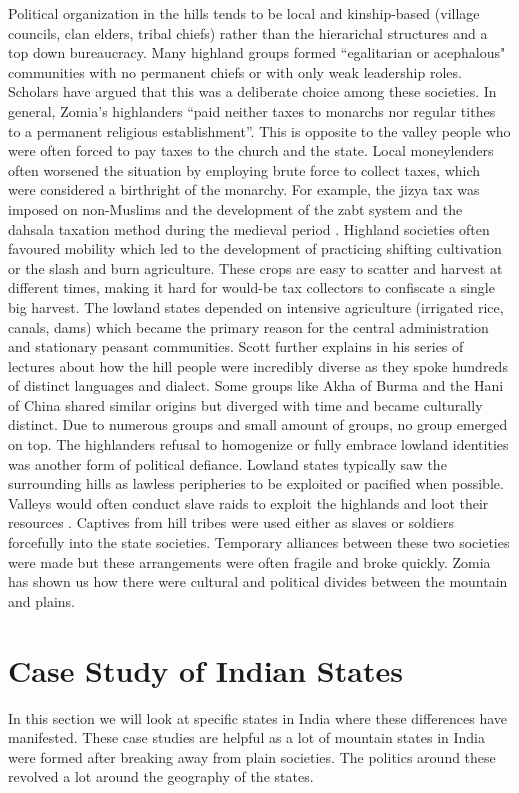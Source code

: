 Political organization in the hills tends to be local and kinship-based (village councils, clan elders, tribal chiefs) rather than the hierarichal structures and a top down bureaucracy. Many highland groups formed ``egalitarian or acephalous" communities with no permanent chiefs or with only weak leadership roles. Scholars have argued that this was a deliberate choice among these societies. In general, Zomia’s highlanders ``paid neither taxes to monarchs nor regular tithes to a permanent religious establishment”. This is opposite to the valley people who were often forced to pay taxes to the church and the state. Local moneylenders often worsened the situation by employing brute force to collect taxes, which were considered a birthright of the monarchy. For example, the jizya tax was imposed on non-Muslims and the development of the zabt system and the dahsala taxation method during the medieval period \citep{moosvi1973production}. Highland societies often favoured mobility which led to the development of practicing shifting cultivation or the slash and burn agriculture. These crops are easy to scatter and harvest at different times, making it hard for would-be tax collectors to confiscate a single big harvest. The lowland states depended on intensive agriculture (irrigated rice, canals, dams) which became the primary reason for the central administration and stationary peasant communities. Scott further explains in his series of lectures  \citep{scott2005civilizations} about how the hill people were incredibly diverse as they spoke hundreds of distinct languages and dialect. Some groups like Akha of Burma and the Hani of China shared similar origins \citep{boonyasaranai2014common} but diverged with time and became culturally distinct. Due to numerous groups and small amount of groups, no group emerged on top. The highlanders refusal to homogenize or fully embrace lowland identities was another form of political defiance. Lowland states typically saw the surrounding hills as lawless peripheries to be exploited or pacified when possible. Valleys would often conduct slave raids to exploit the highlands and loot their resources \citep{walker1999legend}. Captives from hill tribes were used either as slaves or soldiers forcefully into the state societies. Temporary alliances between these two societies were made  but these arrangements were often fragile and broke quickly. Zomia has shown us how there were cultural and political divides between the mountain and plains.

\section{Case Study of Indian States}
In this section we will look at specific states in India where these differences have manifested. These case studies are helpful as a lot of mountain states in India were formed after breaking away from plain societies. The politics around these revolved a lot around the geography of the states.

